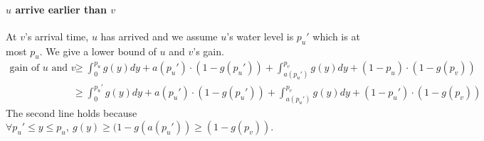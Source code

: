\paragraph{$u$ arrive earlier than $v$} At $v$'s arrival time, $u$ has arrived and we assume $u$'s water level is $p_u'$ which is at most $p_u$. We give a lower bound of $u$ and $v$'s gain.
\begin{align*}
    \text{gain of $u$ and $v$} 
    &\geq \int_0^{p_u} g(y) dy + a(p_u')\cdot (1-g(p_u')) + \int_{a(p_u')}^{p_v} g(y) dy + (1-p_u)\cdot(1-g(p_v)) \\
    &\geq \int_0^{p_u'} g(y) dy + a(p_u')\cdot (1-g(p_u')) + \int_{a(p_u')}^{p_v} g(y) dy + (1-p_u')\cdot(1-g(p_v)) 
\end{align*}
The second line holds because $\forall p_u'\leq y\leq p_u,~g(y) \geq (1-g(a(p_u'))\geq (1-g(p_v))$.
